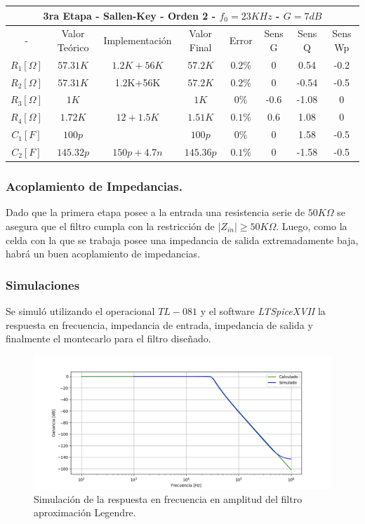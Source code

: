 \begin{table}[H]
\centering
\begin{tabular}{@{}cccccccc@{}}
\multicolumn{8}{c}{3ra Etapa - Sallen-Key - Orden 2 - $f_0 = 23KHz$ - $G=7dB$} \\ \midrule
- & Valor Teórico & Implementación & Valor Final & Error & Sens G & Sens Q & Sens Wp \\ \midrule
$R_1 [\Omega]$ & $57.31K$ & $1.2K+56K$ & $57.2K$ & $0.2\%$ & 0 & 0.54 & -0.2 \\
$R_2 [\Omega]$ & $57.31K$ & 1.2K+56K & $57.2K$ & $0.2\%$ & 0 & -0.54 & -0.5 \\
$R_3 [\Omega]$ & $1K$ &  & $1K$ & $0\%$ & -0.6 & -1.08 & 0 \\
$R_4 [\Omega]$ & $1.72K$ & $12+1.5K$ & $1.51K$ & $0.1\%$ & 0.6 & 1.08 & 0 \\
$C_1 [F]$ & $100p$ &  & $100p$ & $0\%$ & 0 & 1.58 & -0.5 \\
$C_2 [F]$ & $145.32p$ & $150p+4.7n$ & $145.36p$ & $0.1\%$ & 0 & -1.58 & -0.5 \\ \bottomrule
\end{tabular}
\end{table}

\subsubsection{Acoplamiento de Impedancias.}
Dado que la primera etapa posee a la entrada una resistencia serie de $50K\Omega$ se asegura que el filtro cumpla con la restricción de $|Z_{in}| \geq 50K\Omega$. Luego, como la celda con la que se trabaja posee una impedancia de salida extremadamente baja, habrá un buen acoplamiento de impedancias.

\subsubsection{Simulaciones}

Se simuló utilizando el operacional $TL-081$ y el software \textit{LTSpiceXVII} la respuesta en frecuencia, impedancia de entrada, impedancia de salida y finalmente el montecarlo para el filtro diseñado.

\begin{figure}[H]
\centering
	\centering
	\includegraphics[width=\textwidth]{Imagenes-Ej1/legendre_hs_sim.png}
	\caption{Simulación de la respuesta en frecuencia en amplitud del filtro aproximación Legendre.}
	\label{leg_gain_sim}
\end{figure}

